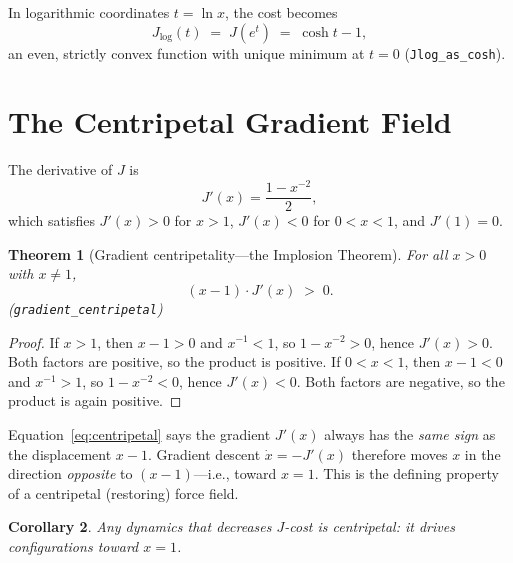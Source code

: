 \documentclass[11pt,a4paper]{article}
\newtheorem{theorem}{Theorem}[section]
\newtheorem{corollary}[theorem]{Corollary}
\theoremstyle{definition}
\newcommand{\Jc}{J}
\newcommand{\code}[1]{\texttt{\small #1}}
\begin{document}
In logarithmic coordinates $t = \ln x$, the cost becomes
\begin{equation}\label{eq:Jlog}
  \Jc_{\log}(t) \;=\; \Jc(e^t) \;=\; \cosh t - 1,
\end{equation}
an even, strictly convex function with unique minimum at $t=0$
(\code{Jlog\_as\_cosh}).

\section{The Centripetal Gradient Field}
\label{sec:centripetal}

The derivative of $\Jc$ is
\begin{equation}\label{eq:Jprime}
  \Jc'(x) = \frac{1 - x^{-2}}{2},
\end{equation}
which satisfies $\Jc'(x) > 0$ for $x > 1$, $\Jc'(x) < 0$ for $0<x<1$,
and $\Jc'(1) = 0$.

\begin{theorem}[Gradient centripetality---the Implosion Theorem]
\label{thm:centripetal}
For all $x > 0$ with $x \ne 1$,
\begin{equation}\label{eq:centripetal}
  (x - 1) \cdot \Jc'(x) \;>\; 0.
\end{equation}
\textup{(\code{gradient\_centripetal})}
\end{theorem}

\begin{proof}
If $x > 1$, then $x-1 > 0$ and $x^{-1} < 1$, so $1 - x^{-2} > 0$,
hence $\Jc'(x) > 0$.  Both factors are positive, so the product is
positive.  If $0 < x < 1$, then $x - 1 < 0$ and $x^{-1} > 1$, so
$1 - x^{-2} < 0$, hence $\Jc'(x) < 0$.  Both factors are negative,
so the product is again positive.
\end{proof}

Equation~\eqref{eq:centripetal} says the gradient $\Jc'(x)$ always has
the \emph{same sign} as the displacement $x - 1$.  Gradient descent
$\dot x = -\Jc'(x)$ therefore moves $x$ in the direction \emph{opposite}
to $(x-1)$---i.e., toward $x = 1$.  This is the defining property of a
centripetal (restoring) force field.

\begin{corollary}
Any dynamics that decreases $\Jc$-cost is centripetal: it drives
configurations toward $x = 1$.
\end{corollary}
\end{document}
